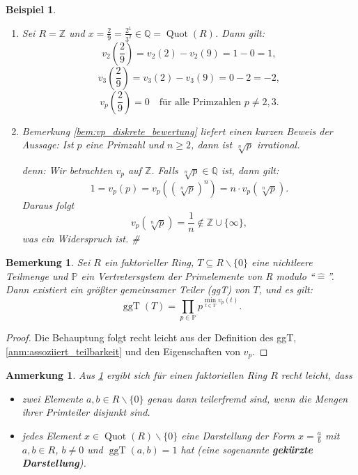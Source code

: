 \documentclass[a4paper, twoside, 11pt, ngerman]{report}
\newcommand{\PP}{\mathds P}
\newcommand{\QQ}{\mathds Q}
\newcommand{\ZZ}{\mathds Z}
\renewcommand{\setminus}{\smallsetminus}
\newcommand{\assoc}{\mathrel{\widehat{=}}}
\DeclareMathOperator{\ggT}{ggT}
\DeclareMathOperator{\Quot}{Quot}
\theoremstyle{definistyle}
\newtheorem{bem}[satz]{Bemerkung}
\newtheorem{anm}[satz]{Anmerkung}
\newtheorem{bsp}[satz]{Beispiel}
\theoremstyle{remark}
\newenvironment{denn}%
  {\par\textit{denn:}}%
  {\hfill\#\par}
\newcommand{\defn}[1]{\textit{\bfseries #1}}
\begin{document}
\begin{bsp}\label{bsp:diskrete_bewertung_auf_Q}
\begin{enumerate}[label=(\alph*)]
\item Sei $R = \ZZ$ und $x = \frac{2}{9}=\frac{2^1}{3^2} \in \QQ = \Quot(R)$. Dann gilt:
\[
v_2\left(\frac{2}{9}\right) = v_2(2) - v_2(9) = 1 - 0 = 1,
\]
\[
v_3\left(\frac{2}{9}\right) = v_3(2) - v_3(9) = 0 - 2 = -2,
\]
\[
v_p\left(\frac{2}{9}\right) = 0 \quad \text{für alle Primzahlen } p \neq 2, 3.
\]

\item Bemerkung \ref{bem:vp_diskrete_bewertung} liefert einen kurzen Beweis der Aussage:
Ist $p$ eine Primzahl und $n \geq 2$, dann ist $\sqrt[n]{p}$ irrational.
\begin{denn} Wir betrachten $v_p$ auf $\ZZ$. Falls $\sqrt[n]{p} \in \QQ$ ist, dann gilt:
\[
1 = v_p(p) = v_p\left(\left(\sqrt[n]{p}\right)^n\right) = n \cdot v_p\left(\sqrt[n]{p}\right).
\]
Daraus folgt
\[
v_p\left(\sqrt[n]{p}\right) = \frac{1}{n} \notin \ZZ \cup \{\infty\},
\]
was ein Widerspruch ist.
\end{denn}
\end{enumerate}
\end{bsp}

\begin{bem}\label{bem:ggt_faktorieller_ring}
Sei $R$ ein faktorieller Ring, $T \subseteq R \setminus \{0\}$ eine nichtleere Teilmenge
und $\PP$ ein Vertretersystem der Primelemente von R modulo "`$\assoc$"'.
Dann existiert ein größter gemeinsamer Teiler (ggT) von $T$, und es gilt:
\[
\ggT(T) = \prod_{p \in \PP} p^{\min_{t \in T} v_p(t)}.
\]
\end{bem}

\begin{proof}
Die Behauptung folgt recht leicht aus der Definition des ggT, \ref{anm:assoziiert_teilbarkeit} und den Eigenschaften von $v_p$.
\end{proof}

\begin{anm} 
Aus \ref{bem:ggt_faktorieller_ring} ergibt sich für einen faktoriellen Ring $R$ recht leicht, dass
\begin{itemize}
\item zwei Elemente $a,b\in R\setminus\{0\}$ genau dann teilerfremd sind, wenn die Mengen ihrer Primteiler disjunkt sind.
\item jedes Element $x\in\Quot(R)\setminus\{0\}$ eine Darstellung der Form $x=\frac{a}{b}$ mit $a,b\in R$, $b\neq 0$ und $\ggT(a,b)=1$ hat (eine sogenannte \defn{gekürzte Darstellung}).
\end{itemize}
\end{anm}
\end{document}

